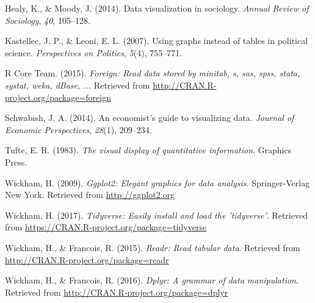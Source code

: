 \documentclass[12pt,oneside]{reedthesis}
\theoremstyle{definition}
\theoremstyle{definition}
\theoremstyle{definition}
\theoremstyle{remark}
\begin{document}
  \hypertarget{ref-healymoody2014}{}
  Healy, K., \& Moody, J. (2014). Data visualization in sociology.
  \emph{Annual Review of Sociology}, \emph{40}, 105--128.
  
  \hypertarget{ref-kastellecleoni2007}{}
  Kastellec, J. P., \& Leoni, E. L. (2007). Using graphs instead of tables
  in political science. \emph{Perspectives on Politics}, \emph{5}(4),
  755--771.
  
  \hypertarget{ref-rcoreteam2015foreign}{}
  R Core Team. (2015). \emph{Foreign: Read data stored by minitab, s, sas,
  spss, stata, systat, weka, dBase, ...} Retrieved from
  \url{http://CRAN.R-project.org/package=foreign}
  
  \hypertarget{ref-schwabish2014}{}
  Schwabish, J. A. (2014). An economist's guide to visualizing data.
  \emph{Journal of Economic Perspectives}, \emph{28}(1), 209--234.
  
  \hypertarget{ref-tufte1983}{}
  Tufte, E. R. (1983). \emph{The visual display of quantitative
  information}. Graphics Press.
  
  \hypertarget{ref-wickham2009}{}
  Wickham, H. (2009). \emph{Ggplot2: Elegant graphics for data analysis}.
  Springer-Verlag New York. Retrieved from \url{http://ggplot2.org}
  
  \hypertarget{ref-wickham2017}{}
  Wickham, H. (2017). \emph{Tidyverse: Easily install and load the
  'tidyverse'}. Retrieved from
  \url{https://CRAN.R-project.org/package=tidyverse}
  
  \hypertarget{ref-wickhamfrancois2015}{}
  Wickham, H., \& Francois, R. (2015). \emph{Readr: Read tabular data}.
  Retrieved from \url{http://CRAN.R-project.org/package=readr}
  
  \hypertarget{ref-wickhamfrancois2016}{}
  Wickham, H., \& Francois, R. (2016). \emph{Dplyr: A grammar of data
  manipulation}. Retrieved from
  \url{http://CRAN.R-project.org/package=dplyr}


\end{document}
